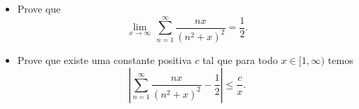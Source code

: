 \begin{itemize}
    \item[(a)] Prove que
    \[ \lim_{x\to \infty}\,\sum_{n=1}^{\infty} \frac{nx}{(n^{2}+x)^{2}}=\frac{1}{2}.\]
    \item[(b)] Prove que existe uma constante positiva \(c\) tal que para todo \(x\in [1,\infty)\) temos
    \[\left|\sum_{n=1}^{\infty} \frac{nx}{(n^{2}+x)^{2}}-\frac{1}{2} \right| \leq \frac{c}{x}.\]
\end{itemize}
